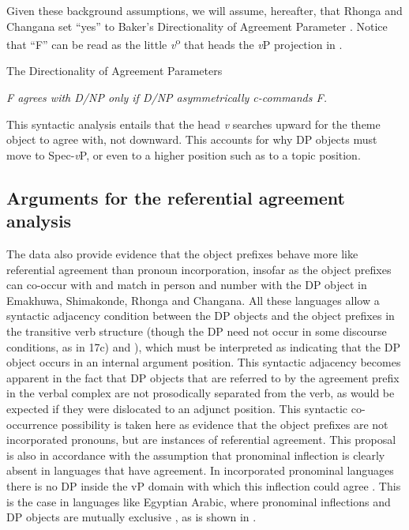\documentclass[output=paper]{langsci/langscibook}
\begin{document}
Given these background assumptions, we will assume, hereafter, that Rhonga and Changana set “yes” to Baker’s Directionality of Agreement Parameter . Notice that “F” can be read as the little \textit{v}\textsuperscript{o} that heads the {\textit{v}}P projection in .

\ea\label{ex:nguna:23}
{The Directionality of Agreement Parameters \citep[155]{Baker2008}}

{\textit{F agrees with D/NP only if D/NP asymmetrically c-commands F.}}
\z

This syntactic analysis entails that the head {\textit{v}} searches upward for the theme object to agree with, not downward. This accounts for why DP objects must move to Spec-{\textit{v}}P, or even to a higher position such as to a topic position.

\subsection{Arguments for the referential agreement analysis}\label{sec:nguna:4.2}

The data also provide evidence that the object prefixes behave more like referential agreement than pronoun incorporation, insofar as the object prefixes can co-occur with and match in person and number with the DP object in Emakhuwa, Shimakonde, Rhonga and Changana. All these languages allow a syntactic adjacency condition between the DP objects and the object prefixes in the transitive verb structure (though the DP need not occur in some discourse conditions, as in 17c) and ), which must be interpreted as indicating that the DP object occurs in an internal argument position. This syntactic adjacency becomes apparent in the fact that DP objects that are referred to by the agreement prefix in the verbal complex are not prosodically separated from the verb, as would be expected if they were dislocated to an adjunct position. This syntactic co-occurrence possibility is taken here as evidence that the object prefixes are not incorporated pronouns, but are instances of referential agreement. This proposal is also in accordance with the assumption that pronominal inflection is clearly absent in languages that have agreement. In incorporated pronominal languages there is no DP inside the vP domain with which this inflection could agree \citep{Jelinek1989}. This is the case in languages like Egyptian Arabic, where pronominal inflections and DP objects are mutually exclusive \citep{Jelinek1989}, as is shown in .
\end{document}

